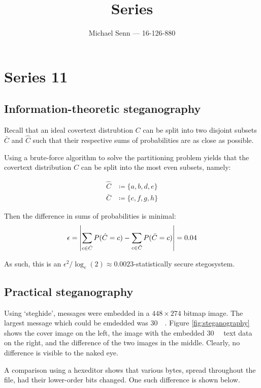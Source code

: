 \documentclass[a4paper]{scrreprt}
\title{Series \series}
\author{Michael Senn \maillink{michael.senn@students.unibe.ch} --- 16-126-880}
\date{\printdate}
\DeclarePairedDelimiter\abs{\lvert}{\rvert}
\newcommand{\series}{11}
\begin{document}
\maketitle


\setcounter{chapter}{\numexpr \series - 1 \relax}

\chapter{Series \series}

\section{Information-theoretic steganography}

Recall that an ideal covertext distrubtion $C$ can be split into two disjoint
subsets $\bar{C}$ and $\hat{C}$ such that their respective sums of
probabilities are as close as possible.

Using a brute-force algorithm to solve the partitioning problem yields that the
covertext distribution $C$ can be split into the most even subsets, namely:

\begin{align*}
		\hat{C} & \coloneqq \{a, b, d, e\} \\
		\bar{C} & \coloneqq \{c, f, g, h\}
\end{align*}

Then the difference in sums of probabilities is minimal:
\[
		\epsilon = \abs*{
				\sum_{c \in \hat{C}} P(\hat{C} = c) - 
		        \sum_{c \in \bar{C}} P(\bar{C} = c)} 
		= 0.04
\]

As such, this is an $\epsilon^2 / \log_e(2) \approx 0.0023$-statistically
secure stegosystem.

\section{Practical steganography}

Using `steghide', messages were embedded in a $448 \times 274$ bitmap image.
The largest message which could be emdedded was \SI{30}{\kilo\byte}.  Figure
\ref{fig:steganography} shows the cover image on the left, the image with the
embedded \SI{30}{\kilo\byte} text data on the right, and the difference of
the two images in the middle.  Clearly, no difference is visible to the naked
eye.

A comparison using a hexeditor shows that various bytes, spread throughout the
file, had their lower-order bits changed. One such difference is shown below.
\end{document}
